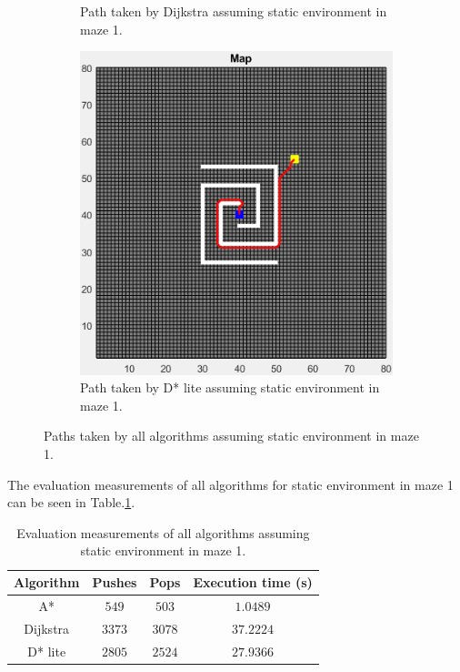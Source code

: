 \begin{figure}
\begin{subfigure}[t]{0.32\columnwidth}
		\caption{Path taken by Dijkstra assuming static environment in maze 1.}
        \label{fig:dijkstra_static_path_maze_1}
	\end{subfigure}
    \hfill
    \begin{subfigure}[t]{0.32\columnwidth}
		\centering
		\includegraphics[width=\textwidth]{images/d_star_lite_static_maze_1.png}
		\caption{Path taken by D* lite assuming static environment in maze 1.}
        \label{fig:d_star_static_path_maze_1}
	\end{subfigure}
	\caption{Paths taken by all algorithms assuming static environment in maze 1.}
    \label{fig:static_path_maze_1}
\end{figure}

The evaluation measurements of all algorithms for static environment in maze 1 can be seen in Table.\:\ref{tab:metric_static_maze_1}.

\begin{table}
    \centering
    \begin{tabular}{c|c|c|c}
        Algorithm   & Pushes    & Pops      & Execution time (s)    \\ \hline
        A*          & $549$     & $503$     & $1.0489$              \\
        Dijkstra    & $3373$    & $3078$    & $37.2224$             \\
        D* lite     & $2805$    & $2524$    & $27.9366$
    \end{tabular}
    \caption{Evaluation measurements of all algorithms assuming static environment in maze 1.}
    \label{tab:metric_static_maze_1}
\end{table}

